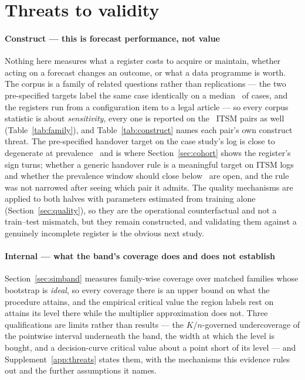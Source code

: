 \section{Threats to validity}
\label{sec:lim}

\paragraph{Construct --- this is forecast performance, not value}
Nothing here measures what a register costs to acquire or maintain, whether
acting on a forecast changes an outcome, or what a data programme is worth.
The corpus is a family of related questions rather than replications --- the
two pre-specified targets label the same case identically on a median
\targetAgreement\ of cases, and the registers run from a configuration item to
a legal article --- so every corpus statistic is about \emph{sensitivity},
every one is reported on the \nItsmPairs\ ITSM pairs as well
(Table~\ref{tab:family}), and Table~\ref{tab:construct} names each pair's own
construct threat. The pre-specified handover target on the case study's log is
close to degenerate at prevalence \prevAdmittedMax\ and is where
Section~\ref{sec:cohort} shows the register's sign turns; whether a generic
handover rule is a meaningful target on ITSM logs and whether the prevalence
window should close below \prevHi\ are open, and the rule was not narrowed
after seeing which pair it admits. The quality mechanisms are applied to both
halves with parameters estimated from training alone
(Section~\ref{sec:quality}), so they are the operational counterfactual and
not a train--test mismatch, but they remain constructed, and validating them
against a genuinely incomplete register is the obvious next study.

\paragraph{Internal --- what the band's coverage does and does not establish}
Section~\ref{sec:simband} measures family-wise coverage over matched families
whose bootstrap is \emph{ideal}, so every coverage there is an upper bound on
what the procedure attains, and the empirical critical value the region
labels rest on attains its level there while the multiplier approximation
does not. Three qualifications are limits rather than results --- the
$K/n$-governed undercoverage of the pointwise interval underneath the band,
the width at which the level is bought, and a decision-curve critical value
about a point short of its level --- and Supplement~\ref{app:threats} states
them, with the mechanisms this evidence rules out and the further
assumptions it names.

